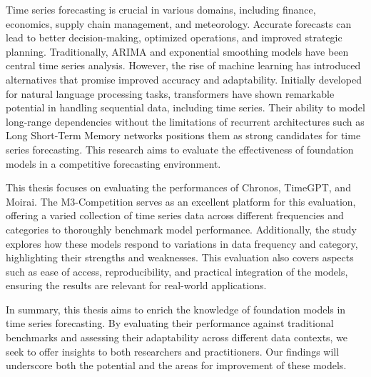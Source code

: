 \documentclass[12pt,a4paper]{article}
\begin{document}
Time series forecasting is crucial in various domains, including finance, economics, supply chain management, and meteorology. Accurate forecasts can lead to better decision-making, optimized operations, and improved strategic planning. Traditionally, ARIMA and exponential smoothing models have been central time series analysis. However, the rise of machine learning has introduced alternatives that promise improved accuracy and adaptability. Initially developed for natural language processing tasks, transformers have shown remarkable potential in handling sequential data, including time series. Their ability to model long-range dependencies without the limitations of recurrent architectures such as Long Short-Term Memory networks positions them as strong candidates for time series forecasting. This research aims to evaluate the effectiveness of foundation models in a competitive forecasting environment.

This thesis focuses on evaluating the performances of Chronos, TimeGPT, and Moirai. The M3-Competition serves as an excellent platform for this evaluation, offering a varied collection of time series data across different frequencies and categories to thoroughly benchmark model performance. Additionally, the study explores how these models respond to variations in data frequency and category, highlighting their strengths and weaknesses. This evaluation also covers aspects such as ease of access, reproducibility, and practical integration of the models, ensuring the results are relevant for real-world applications.

In summary, this thesis aims to enrich the knowledge of foundation models in time series forecasting. By evaluating their performance against traditional benchmarks and assessing their adaptability across different data contexts, we seek to offer insights to both researchers and practitioners. Our findings will underscore both the potential and the areas for improvement of these models.
\end{document}

